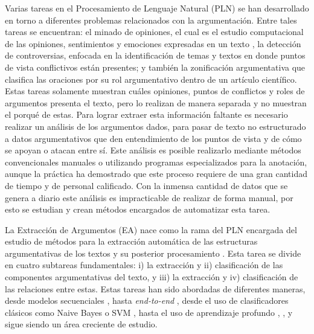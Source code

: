 \documentclass[a4paper,11pt,twocolumn,twoside]{article}
\begin{document}
Varias tareas en el Procesamiento de Lenguaje Natural (PLN) se han desarrollado en 
torno a diferentes problemas relacionados con 
la argumentación. Entre tales tareas se encuentran: el minado de opiniones, el cual es el 
estudio computacional de las opiniones, sentimientos y emociones expresadas en un texto 
\cite{liu2010sentiment}, la detección de controversias, enfocada en la identificación de 
temas y textos en donde puntos de vista conflictivos están presentes; y también la zonificación
argumentativa que clasifica las oraciones por su rol argumentativo dentro de un artículo
científico. Estas tareas solamente muestran cuáles opiniones, puntos de conflictos y roles 
de argumentos 
presenta el texto, pero lo realizan de manera separada y no muestran el porqué de estas. 
Para lograr extraer esta información faltante es necesario realizar un 
análisis de los argumentos dados, para pasar de texto no estructurado a datos argumentativos 
que den entendimiento de los puntos de vista y de cómo se apoyan o atacan entre sí. Este análisis
es posible realizarlo mediante métodos convencionales manuales o utilizando programas
especializados para la anotación, aunque la práctica ha demostrado que este proceso requiere 
de una gran cantidad de tiempo y de personal calificado. Con la inmensa cantidad de datos 
que se genera a diario este análisis es impracticable de realizar de forma manual, por esto se 
estudian y crean métodos encargados de automatizar esta tarea.


La Extracción de Argumentos (EA) nace como la rama del PLN encargada
del estudio de métodos para la extracción automática de las estructuras argumentativas de 
los textos y su posterior procesamiento \cite{lawrence2020argument}. Esta tarea se divide en 
cuatro subtareas fundamentales: i) la extracción y ii) clasificación de las componentes 
argumentativas del texto, y iii) la extracción y 
iv) clasificación de las relaciones entre estas. Estas tareas han sido abordadas de diferentes maneras,
desde modelos secuenciales \cite{palau2009argumentation}, \cite{goudas2015argument} hasta 
\textit{end-to-end} \cite{eger2017neural}, desde el uso de clasificadores clásicos 
como Naive Bayes o SVM \cite{niculae2017argument}, \cite{stab2017parsing} hasta el uso de 
aprendizaje profundo \cite{galassi2021deep}, \cite{mayer2020transformer}, y sigue 
siendo un área creciente de estudio.
\end{document}
